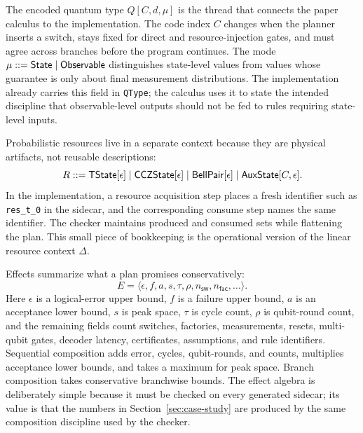 The encoded quantum type $Q[C,d,\mu]$ is the thread that connects the paper calculus to the implementation.
The code index $C$ changes when the planner inserts a switch, stays fixed for direct and resource-injection gates, and must agree across branches before the program continues.
The mode $\mu ::= \mathsf{State} \mid \mathsf{Observable}$ distinguishes state-level values from values whose guarantee is only about final measurement distributions.
The implementation already carries this field in \texttt{QType}; the calculus uses it to state the intended discipline that observable-level outputs should not be fed to rules requiring state-level inputs.

Probabilistic resources live in a separate context because they are physical artifacts, not reusable descriptions:
\[
R ::= \mathsf{TState}[\epsilon] \mid \mathsf{CCZState}[\epsilon] \mid \mathsf{BellPair}[\epsilon] \mid \mathsf{AuxState}[C,\epsilon].
\]
In the implementation, a resource acquisition step places a fresh identifier such as \texttt{res\_t\_0} in the sidecar, and the corresponding consume step names the same identifier.
The checker maintains produced and consumed sets while flattening the plan.
This small piece of bookkeeping is the operational version of the linear resource context $\Delta$.

Effects summarize what a plan promises conservatively:
\[
E = \langle \epsilon, f, a, s, \tau, \rho, n_{\mathsf{sw}}, n_{\mathsf{fac}}, \ldots\rangle.
\]
Here $\epsilon$ is a logical-error upper bound, $f$ is a failure upper bound, $a$ is an acceptance lower bound, $s$ is peak space, $\tau$ is cycle count, $\rho$ is qubit-round count, and the remaining fields count switches, factories, measurements, resets, multi-qubit gates, decoder latency, certificates, assumptions, and rule identifiers.
Sequential composition adds error, cycles, qubit-rounds, and counts, multiplies acceptance lower bounds, and takes a maximum for peak space.
Branch composition takes conservative branchwise bounds.
The effect algebra is deliberately simple because it must be checked on every generated sidecar; its value is that the numbers in Section~\ref{sec:case-study} are produced by the same composition discipline used by the checker.
